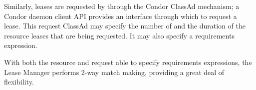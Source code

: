 Similarly, leases are requested by through the Condor ClassAd mechanism;
a Condor daemon client API provides an interface through which to 
request a lease.  
This request ClassAd may specify the number of and the duration of 
the resource leases that are being requested.
It may also specify a requirements expression.

With both the resource and request able to specify requirements expressions, 
the Lease Manager performs 2-way match making, providing a great deal 
of flexibility.


